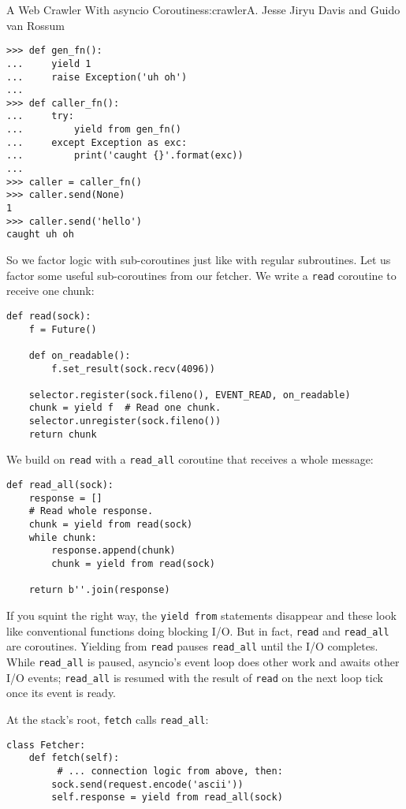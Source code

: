 \begin{aosachapter}{A Web Crawler With asyncio Coroutines}{s:crawler}{A. Jesse Jiryu Davis and Guido van Rossum}
\begin{verbatim}
>>> def gen_fn():
...     yield 1
...     raise Exception('uh oh')
...
>>> def caller_fn():
...     try:
...         yield from gen_fn()
...     except Exception as exc:
...         print('caught {}'.format(exc))
...
>>> caller = caller_fn()
>>> caller.send(None)
1
>>> caller.send('hello')
caught uh oh
\end{verbatim}

So we factor logic with sub-coroutines just like with regular
subroutines. Let us factor some useful sub-coroutines from our fetcher.
We write a \texttt{read} coroutine to receive one chunk:

\begin{verbatim}
def read(sock):
    f = Future()

    def on_readable():
        f.set_result(sock.recv(4096))

    selector.register(sock.fileno(), EVENT_READ, on_readable)
    chunk = yield f  # Read one chunk.
    selector.unregister(sock.fileno())
    return chunk
\end{verbatim}

We build on \texttt{read} with a \texttt{read\_all} coroutine that
receives a whole message:

\begin{verbatim}
def read_all(sock):
    response = []
    # Read whole response.
    chunk = yield from read(sock)
    while chunk:
        response.append(chunk)
        chunk = yield from read(sock)

    return b''.join(response)
\end{verbatim}

If you squint the right way, the \texttt{yield from} statements
disappear and these look like conventional functions doing blocking I/O.
But in fact, \texttt{read} and \texttt{read\_all} are coroutines.
Yielding from \texttt{read} pauses \texttt{read\_all} until the I/O
completes. While \texttt{read\_all} is paused, asyncio's event loop does
other work and awaits other I/O events; \texttt{read\_all} is resumed
with the result of \texttt{read} on the next loop tick once its event is
ready.

At the stack's root, \texttt{fetch} calls \texttt{read\_all}:

\begin{verbatim}
class Fetcher:
    def fetch(self):
         # ... connection logic from above, then:
        sock.send(request.encode('ascii'))
        self.response = yield from read_all(sock)
\end{verbatim}


\end{aosachapter}
